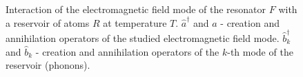 \begin{figure}
\centering



\caption{Interaction of the electromagnetic field mode of the resonator $F$ with
  a reservoir of atoms $R$ at temperature $T$. $\hat{a}^{\dag}$ and
$\hat{a}$ - creation and annihilation operators of the studied electromagnetic field mode.
$\hat{b}_k^{\dag}$ and
$\hat{b}_k$ - creation and annihilation operators of the $k$-th mode of the reservoir (phonons).}
\label{figPart1Ch2_add3}
\end{figure}